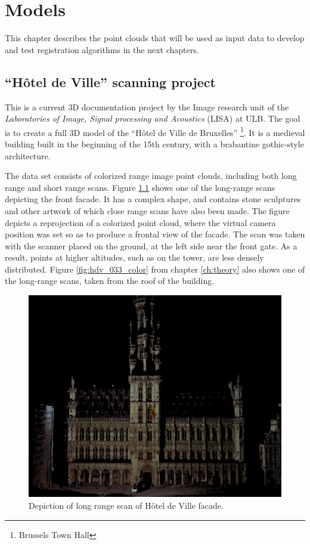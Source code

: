 \chapter{Models} \label{ch:models}
This chapter describes the point clouds that will be used as input data to develop and test registration algorithms in the next chapters.

\section{``Hôtel de Ville'' scanning project}
This is a current 3D documentation project by the Image research unit of the \emph{Laboratories of Image, Signal processing and Acoustics} (LISA) at ULB. The goal is to create a full 3D model of the ``Hôtel de Ville de Bruxelles'' \footnote{Brussels Town Hall}. It is a medieval building built in the beginning of the 15th century, with a brabantine gothic-style architecture.

The data set consists of colorized range image point clouds, including both long range and short range scans. Figure \ref{fig:scan_005} shows one of the long-range scans depicting the front facade. It has a complex shape, and contains stone sculptures and other artwork of which close range scans have also been made. The figure depicts a reprojection of a colorized point cloud, where the virtual camera position was set so as to produce a frontal view of the facade. The scan was taken with the scanner placed on the ground, at the left side near the front gate. As a result, points at higher altitudes, such as on the tower, are less densely distributed. Figure \ref{fig:hdv_033_color} from chapter \ref{ch:theory} also shows one of the long-range scans, taken from the roof of the building.

\begin{figure}[h]
\centering
\includegraphics[width=\textwidth]{fig/scan_005.png}
\caption{Depiction of long range scan of Hôtel de Ville facade.}
\label{fig:scan_005}
\end{figure}


